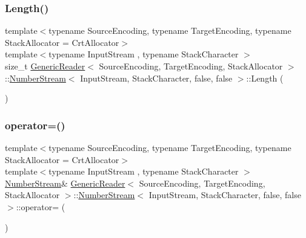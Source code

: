 \subsubsection{\texorpdfstring{Length()}{Length()}}
{\footnotesize\ttfamily template$<$typename Source\+Encoding, typename Target\+Encoding, typename Stack\+Allocator = Crt\+Allocator$>$ \\
template$<$typename Input\+Stream , typename Stack\+Character $>$ \\
size\+\_\+t \hyperlink{classGenericReader}{Generic\+Reader}$<$ Source\+Encoding, Target\+Encoding, Stack\+Allocator $>$\+::\hyperlink{classGenericReader_1_1NumberStream}{Number\+Stream}$<$ Input\+Stream, Stack\+Character, false, false $>$\+::Length (\begin{DoxyParamCaption}{ }\end{DoxyParamCaption})\hspace{0.3cm}{\ttfamily [inline]}}

\mbox{\label{classGenericReader_1_1NumberStream_3_01InputStream_00_01StackCharacter_00_01false_00_01false_01_4_acb2efacd314d67c3a3c149c481d58af8}} 
\subsubsection{\texorpdfstring{operator=()}{operator=()}}
{\footnotesize\ttfamily template$<$typename Source\+Encoding, typename Target\+Encoding, typename Stack\+Allocator = Crt\+Allocator$>$ \\
template$<$typename Input\+Stream , typename Stack\+Character $>$ \\
\hyperlink{classGenericReader_1_1NumberStream}{Number\+Stream}\& \hyperlink{classGenericReader}{Generic\+Reader}$<$ Source\+Encoding, Target\+Encoding, Stack\+Allocator $>$\+::\hyperlink{classGenericReader_1_1NumberStream}{Number\+Stream}$<$ Input\+Stream, Stack\+Character, false, false $>$\+::operator= (\begin{DoxyParamCaption}\item[{const \hyperlink{classGenericReader_1_1NumberStream}{Number\+Stream}$<$ Input\+Stream, Stack\+Character, false, false $>$ \&}]{ }\end{DoxyParamCaption})\hspace{0.3cm}{\ttfamily [protected]}}


